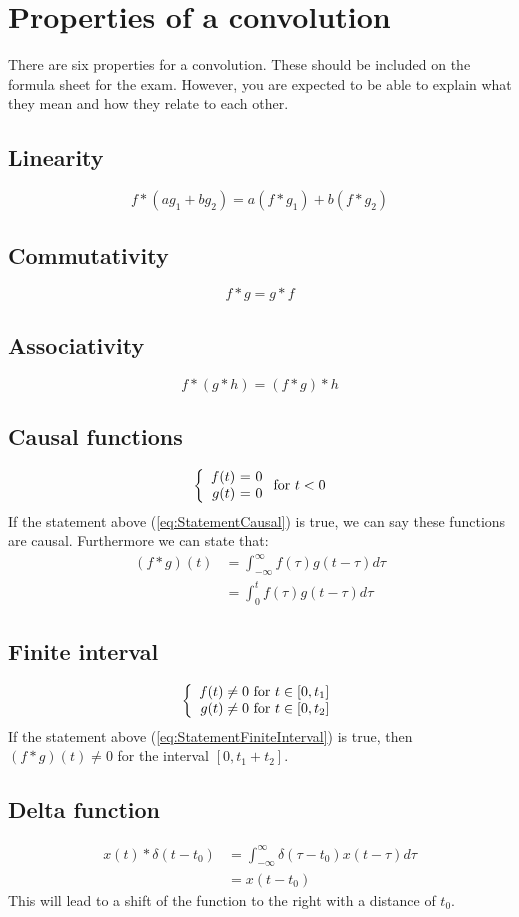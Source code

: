 \documentclass[]{subfiles}
\begin{document}
	\section{Properties of a convolution}
	 There are six properties for a convolution. These should be included on the formula sheet for the exam. However, you are expected to be able to explain what they mean and how they relate to each other.
	 \subsection{Linearity}
	 \begin{equation*}
	 	f\ast (ag_1+bg_2)= a(f\ast g_1)  +b(f\ast g_2)
	 \end{equation*}
 	\subsection{Commutativity}
 	\begin{equation*}
 		f\ast g = g \ast f
 	\end{equation*}
 \subsection{Associativity}
 \begin{equation*}
 	f\ast (g\ast h) = (f\ast g) \ast h
 \end{equation*}
\subsection{Causal functions}
\label{sec:causalFunctions}
\begin{equation}
	\left\{ \begin{array}{r@{\text{ = }}l}
		f(t)& 0\\
		g(t)&0
	\end{array}\right.
	\text{for } t<0
	\label{eq:StatementCausal}
\end{equation}
If the statement above (\ref{eq:StatementCausal}) is true, we can say these functions are causal. Furthermore we can state that:
\begin{align*}
	(f\ast g) (t) &= \int_{-\infty}^{\infty} f(\tau)g(t-\tau)d\tau\\
	&= \int_{0}^{t}f(\tau)g(t-\tau)d\tau
\end{align*}
\subsection{Finite interval}
\begin{equation}
	\left\{ \begin{array}{r@{\text{ for }}l}
		f(t)\neq 0& t\in\left[ 0,t_1\right] \\
		g(t)\neq 0&t\in \left[ 0,t_2\right] 
	\end{array}\right.
	\label{eq:StatementFiniteInterval}
\end{equation}
If the statement above (\ref{eq:StatementFiniteInterval}) is true, then $(f\ast g)(t)\neq 0$ for the interval $\left[0,t_1+t_2 \right] $.
\subsection{Delta function}
\begin{align*}
	x(t)\ast \delta(t-t_0) &= \int_{-\infty}^{\infty}\delta(\tau-t_0)x(t-\tau)d\tau\\
	&=  x(t-t_0)
\end{align*}
This will lead to a shift of the function to the right with a distance of $t_0$. 
\end{document}
